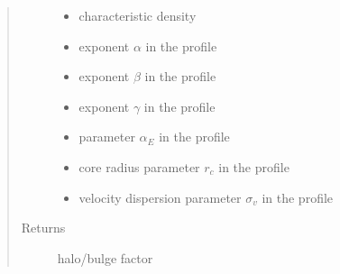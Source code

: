 \documentclass[letterpaper,10pt,english]{sphinxmanual}
\begin{document}
\begin{fulllineitems}
\begin{quote}
\begin{description}
\begin{itemize}
\item {} 
\sphinxAtStartPar
{} \textendash{} characteristic density

\item {} 
\sphinxAtStartPar
{} \textendash{} exponent \(\alpha\) in the {\hyperref[\detokenize{diffsph.profiles:diffsph.profiles.templates.hdz}]{}} profile

\item {} 
\sphinxAtStartPar
{} \textendash{} exponent \(\beta\) in the {\hyperref[\detokenize{diffsph.profiles:diffsph.profiles.templates.hdz}]{}} profile

\item {} 
\sphinxAtStartPar
{} \textendash{} exponent \(\gamma\) in the {\hyperref[\detokenize{diffsph.profiles:diffsph.profiles.templates.hdz}]{}} profile

\item {} 
\sphinxAtStartPar
{} \textendash{} parameter \(\alpha_E\) in the {\hyperref[\detokenize{diffsph.profiles:diffsph.profiles.templates.enst}]{}} profile

\item {} 
\sphinxAtStartPar
{} \textendash{} core radius parameter \(r_c\) in the {\hyperref[\detokenize{diffsph.profiles:diffsph.profiles.templates.cnfw}]{}} profile

\item {} 
\sphinxAtStartPar
{} \textendash{} velocity dispersion parameter \(\sigma_v\) in the {\hyperref[\detokenize{diffsph.profiles:diffsph.profiles.templates.sis}]{}} profile

\end{itemize}

\item[{Returns}] \leavevmode
\sphinxAtStartPar
halo/bulge factor

\end{description}\end{quote}

\end{fulllineitems}
\end{document}
